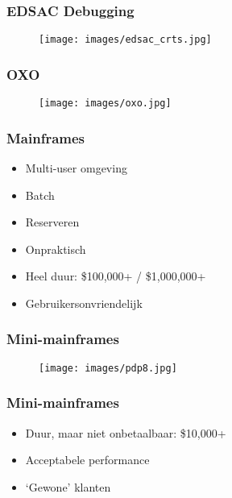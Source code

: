 \documentclass[aspectratio=43]{uva-inf-presentation}
\begin{document}

\begin{frame}
\frametitle{EDSAC Debugging}

\begin{figure}
\texttt{[image: images/edsac\_crts.jpg]}
\end{figure}

\end{frame}


\begin{frame}
\frametitle{OXO}

\begin{figure}
\texttt{[image: images/oxo.jpg]}
\end{figure}

\end{frame}


\begin{frame}
\frametitle{Mainframes}

\begin{itemize}
\item Multi-user omgeving
\item Batch
\item Reserveren
\item Onpraktisch
\item Heel duur: \$100,000+ / \$1,000,000+
\item Gebruikersonvriendelijk
\end{itemize}

\end{frame}


\begin{frame}
\frametitle{Mini-mainframes}

\begin{figure}
\texttt{[image: images/pdp8.jpg]}
\end{figure}

\end{frame}


\begin{frame}
\frametitle{Mini-mainframes}

\begin{itemize}
\item Duur, maar niet onbetaalbaar: \$10,000+
\item Acceptabele performance
\item `Gewone' klanten
\end{itemize}

\end{frame}
\end{document}
